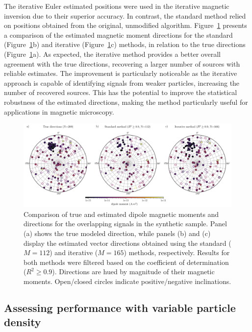 The iterative Euler estimated positions were used in the iterative magnetic inversion due to their superior accuracy. In contrast, the standard method relied on positions obtained from the original, unmodified algorithm. Figure~\ref{inversion2} presents a comparison of the estimated magnetic moment directions for the standard (Figure~\ref{inversion2}b) and iterative (Figure~\ref{inversion2}c) methods, in relation to the true directions (Figure~\ref{inversion2}a). As expected, the iterative method provides a better overall agreement with the true directions, recovering a larger number of sources with reliable estimates. The improvement is particularly noticeable as the iterative approach is capable of identifying signals from weaker particles, increasing the number of recovered sources. This has the potential to improve the statistical robustness of the estimated directions, making the method particularly useful for applications in magnetic microscopy.


\begin{figure}[tb!]
  \centering
  \includegraphics[width=1\linewidth]{paper/figures/synthetic-data-stereograms-comparison.png}
  \caption{
    Comparison of true and estimated dipole magnetic moments and directions for the overlapping signals in the synthetic sample. Panel (a) shows the true modeled direction, while panels (b) and (c) display the estimated vector directions obtained using the standard ($M = 112$) and iterative ($M = 165$) methods, respectively. Results for both methods were filtered based on the coefficient of determination ($R^2 \geq 0.9$). Directions are hued by magnitude of their magnetic moments. Open/closed circles indicate positive/negative inclinations.
  }
  \label{inversion2}
\end{figure}



\subsection{Assessing performance with variable particle density}

